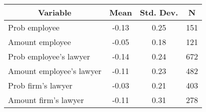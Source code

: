 

\begin{tabular}{l c c  c}\hline\hline
\multicolumn{1}{c}{\textbf{Variable}} & \textbf{Mean}
 & \textbf{Std. Dev.} & \textbf{N}\\ \hline
Prob employee & -0.13 & 0.25  & 151\\
Amount employee & -0.05 & 0.18  & 121\\
Prob employee's lawyer & -0.14 & 0.24  & 672\\
Amount employee's lawyer & -0.11 & 0.23  & 482\\
Prob firm's lawyer & -0.03 & 0.21  & 403\\
Amount firm's lawyer & -0.11 & 0.31  & 278\\
\hline\end{tabular}

